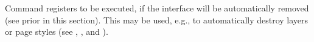 \begin{Declaration}
\end{Declaration}
Command  registers  to be
executed, if the interface will be automatically removed (see
 prior in this section). This
may be used, e.g., to automatically destroy layers or page styles (see
,
, and
).%
\EndIndexGroup
%
\EndIndexGroup



